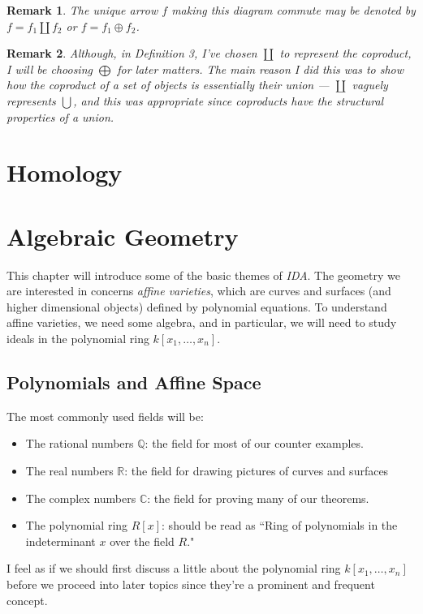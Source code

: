 \documentclass[12pt,reqno]{amsart}
\theoremstyle{plain}
\newtheorem{rem}{Remark}
\newcommand{\rr}{\mathbb R}
\newcommand{\cc}{\mathbb C}
\newcommand{\qq}{\mathbb Q}
\begin{document}
\begin{rem} The unique arrow $f$ making this diagram commute may be denoted by $f = f_1 \coprod f_2$ or $f = f_1 \oplus f_2$. 
\end{rem} 
\begin{rem} Although, in Definition 3, I've chosen $\coprod$ to represent the coproduct, I will be choosing $\bigoplus$ for later matters. The main reason I did this was to show how the coproduct of a set of objects is essentially their union — $\coprod$ vaguely represents $\bigcup$, and this was appropriate since coproducts have the structural properties of a union.
\end{rem} 

\section{Homology}
\newpage 

\newpage 
\section{Algebraic Geometry}
This chapter will introduce some of the basic themes of \textit{IDA}. The geometry we are interested in concerns \textit{affine varieties}, which are curves and surfaces (and higher dimensional objects) defined by polynomial equations. To understand affine varieties, we need some algebra, and in particular, we will need to study ideals in the polynomial ring $k [x_1, \ldots, x_n]$. 
\subsection{Polynomials and Affine Space} 


The most commonly used fields will be:
\begin{itemize}
\item The rational numbers $\qq$: the field for most of our counter examples.
\item The real numbers $\rr$: the field for drawing pictures of curves and surfaces
\item The complex numbers $\cc$: the field for proving many of our theorems. 
\item The polynomial ring $R[x]$: should be read as ``Ring of polynomials in the indeterminant $x$ over the field $R$."
\end{itemize}

I feel as if we should first discuss a little about the polynomial ring $k[x_1, \ldots , x_n]$ before we proceed into later topics since they're a prominent and frequent concept. 
\end{document}
